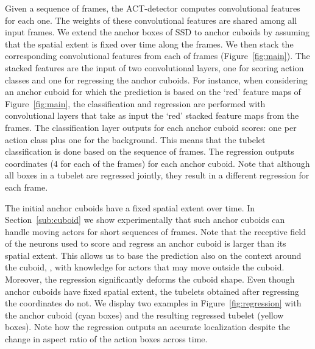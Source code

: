 \documentclass[10pt,twocolumn,letterpaper]{article}
\begin{document}
Given a sequence of  frames, the ACT-detector computes convolutional features for each one. The weights of these convolutional features are shared among all input frames. 
We extend the anchor boxes of SSD to anchor cuboids by assuming that the spatial extent is fixed over time along the  frames. 
We then stack the corresponding convolutional features from each of  frames (Figure~\ref{fig:main}). 
The stacked features are the input of two convolutional layers, one for scoring action classes and one for regressing the anchor cuboids. 
For instance, when considering an anchor cuboid for which the prediction is based on the `red' feature maps of Figure~\ref{fig:main}, the classification and regression are performed with convolutional layers that take as input the `red' stacked feature maps from the  frames. 
The classification layer outputs for each anchor cuboid  scores: one per action class plus one for the background. This means that the tubelet classification is done based on the sequence of frames. 
The regression outputs  coordinates (4 for each of the  frames) for each anchor cuboid. Note that although all boxes in a tubelet are regressed jointly, they result in a different regression for each frame.

The initial anchor cuboids have a fixed spatial extent over time. In Section~\ref{sub:cuboid} we show experimentally that such anchor cuboids can handle moving actors for short sequences of frames. Note that the receptive field of the neurons used to score and regress an anchor cuboid is larger than its spatial extent. This allows us to base the prediction also on the context around the cuboid, \ie, with knowledge for actors that may move outside the cuboid. Moreover, the regression significantly deforms the cuboid shape. Even though anchor cuboids have fixed spatial extent, the tubelets obtained after regressing the  coordinates do not. We display two examples in Figure~\ref{fig:regression} with the anchor cuboid (cyan boxes) and the resulting regressed tubelet (yellow boxes). Note how the regression outputs an accurate localization despite the change in aspect ratio of the action boxes across time.
\end{document}
